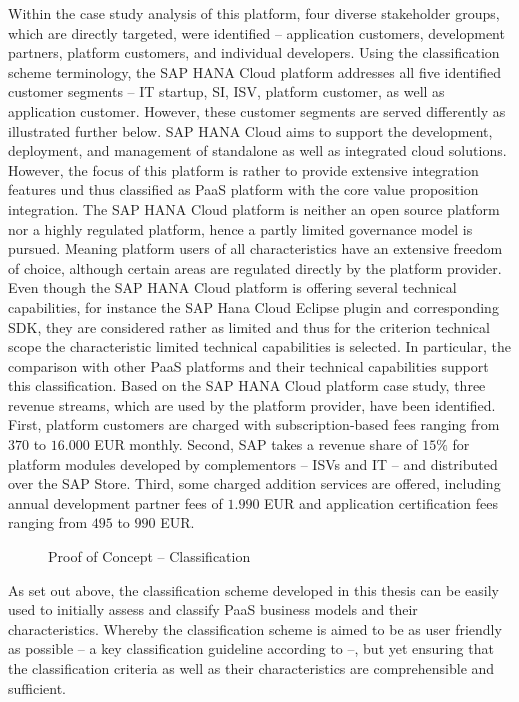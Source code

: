 Within the case study analysis of this platform, four diverse stakeholder groups, which are directly targeted, were identified -- application customers, development partners, platform customers, and individual developers. Using the classification scheme terminology, the SAP HANA Cloud platform addresses all five identified customer segments -- \ac{IT} startup, \ac{SI}, \ac{ISV}, platform customer, as well as application customer. However, these customer segments are served differently as illustrated further below. SAP HANA Cloud aims to support the development, deployment, and management of standalone as well as integrated cloud solutions. However, the focus of this platform is rather to provide extensive integration features und thus classified as \ac{PaaS} platform with the core value proposition integration. The SAP HANA Cloud platform is neither an open source platform nor a highly regulated platform, hence a partly limited governance model is pursued. Meaning platform users of all characteristics have an extensive freedom of choice, although certain areas are regulated directly by the platform provider. Even though the SAP HANA Cloud platform is offering several technical capabilities, for instance the SAP Hana Cloud Eclipse plugin and corresponding \ac{SDK}, they are considered rather as limited and thus for the criterion technical scope the characteristic limited technical capabilities is selected. In particular, the comparison with other \ac{PaaS} platforms and their technical capabilities support this classification. Based on the SAP HANA Cloud platform case study, three revenue streams, which are used by the platform provider, have been identified. First, platform customers are charged with subscription-based fees ranging from $370$ to $16.000$ \ac{EUR} monthly. Second, SAP takes a revenue share of $15\%$ for platform modules developed by complementors -- \acp{ISV} and \ac{IT} -- and distributed over the SAP Store. Third, some charged addition services are offered, including annual development partner fees of $1.990$ \ac{EUR} and application certification fees ranging from $495$ to $990$ \ac{EUR}.

\begin{figure}[tb]
	\centering
	
	\caption{Proof of Concept -- Classification}
	\label{fig:cs:sap}
\end{figure}

As set out above, the classification scheme developed in this thesis can be easily used to initially assess and classify \ac{PaaS} business models and their characteristics. Whereby the classification scheme is aimed to be as user friendly as possible -- a key classification guideline according to \citet[p. 41]{Fettke2003} --, but yet ensuring that the classification criteria as well as their characteristics are comprehensible and sufficient.


